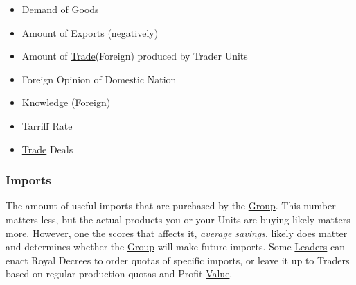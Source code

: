 \documentclass[11pt]{article}
\begin{document}
\begin{enumerate}
\begin{itemize}
\item Demand of Goods\\
\item Amount of Exports (negatively)\\
\item Amount of \hyperref[orgdbeaa2d]{Trade}(Foreign) produced by Trader Units\\
\item Foreign Opinion of Domestic Nation\\
\item \hyperref[orgd7203c2]{Knowledge} (Foreign)\\
\item Tarriff Rate\\
\item \hyperref[orgdbeaa2d]{Trade} Deals\\
\end{itemize}
\end{enumerate}
\subsubsection{Imports}
\label{sec:org876635d}
The amount of useful imports that are purchased by the \hyperref[org3bac9f0]{Group}. This number matters less, but the actual products you or your Units are buying likely matters more. However, one the scores that affects it, \emph{average savings}, likely does matter and determines whether the \hyperref[org3bac9f0]{Group} will make future imports. Some \hyperref[org841e9de]{Leaders} can enact Royal Decrees to order quotas of specific imports, or leave it up to Traders based on regular production quotas and Profit \hyperref[orgcfc0c4f]{Value}.\\
\end{document}
